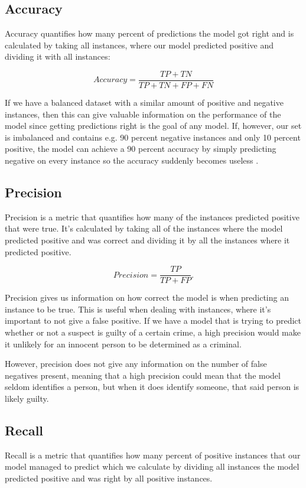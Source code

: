 \documentclass[nofilelist]{cslthse-msc}
\begin{document}






\subsection{Accuracy}
Accuracy quantifies how many percent of predictions the model got right and is calculated by taking all instances, where our model predicted positive and dividing it with all instances:

$$ Accuracy = \frac{TP + TN}{TP + TN + FP + FN}$$

If we have a balanced dataset with a similar amount of positive and negative instances, then this can give valuable information on the performance of the model since getting predictions right is the goal of any model. If, however, our set is imbalanced and contains e.g. 90 percent negative instances and only 10 percent positive, the model can achieve a 90 percent accuracy by simply predicting negative on every instance so the accuracy suddenly becomes useless \citep{imbalancedlearning}. 

\subsection{Precision}
Precision is a metric that quantifies how many of the instances predicted positive that were true. It's calculated by taking all of the instances where the model predicted positive and was correct and dividing it by all the instances where it predicted positive.

$$ Precision = \frac{TP}{TP + FP}.$$

Precision gives us information on how correct the model is when predicting an instance to be true. This is useful when dealing with instances, where it's important to not give a false positive. If we have a model that is trying to predict whether or not a suspect is guilty of a certain crime, a high precision would make it unlikely for an innocent person to be determined as a criminal. 

However, precision does not give any information on the number of false negatives present, meaning that a high precision could mean that the model seldom identifies a person, but when it does identify someone, that said person is likely guilty.

\subsection{Recall}
Recall is a metric that quantifies how many percent of positive instances that our model managed to predict which we calculate by dividing all instances the model predicted positive and was right by all positive instances.
\end{document}
